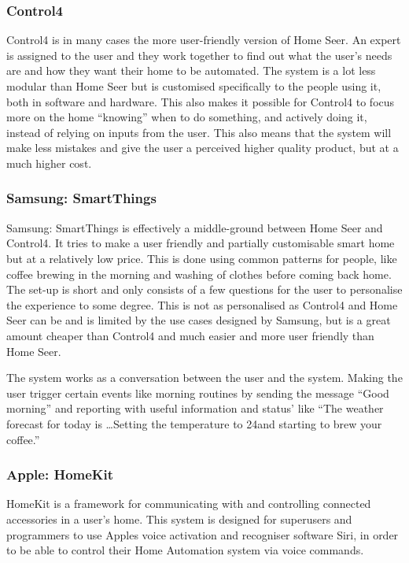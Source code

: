 \subsubsection{Control4}
Control4 is in many cases the more user-friendly version of Home Seer. An expert is assigned to the user and they work together to find out what the user's needs are and how they want their home to be automated. The system is a lot less modular than Home Seer but is customised specifically to the people using it, both in software and hardware. This also makes it possible for Control4 to focus more on the home \enquote{knowing} when to do something, and actively doing it, instead of relying on inputs from the user. This also means that the system will make less mistakes and give the user a perceived higher quality product, but at a much higher cost.%

\subsubsection{Samsung: SmartThings}
Samsung: SmartThings is effectively a middle-ground between Home Seer and Control4. It tries to make a user friendly and partially customisable smart home but at a relatively low price. This is done using common patterns for people, like coffee brewing in the morning and washing of clothes before coming back home. The set-up is short and only consists of a few questions for the user to personalise the experience to some degree. This is not as personalised as Control4 and Home Seer can be and is limited by the use cases designed by Samsung, but is a great amount cheaper than Control4 and much easier and more user friendly than Home Seer.

The system works as a conversation between the user and the system. Making the user trigger certain events like morning routines by sending the message \enquote{Good morning} and reporting with useful information and status' like \enquote{The weather forecast for today is \dots Setting the temperature to 24\degree and starting to brew your coffee.}

\subsubsection{Apple: HomeKit}
HomeKit is a framework for communicating with and controlling connected accessories in a user's home. %
This system is designed for superusers and programmers to use Apples voice activation and recogniser software Siri, in order to be able to control their Home Automation system via voice commands.

